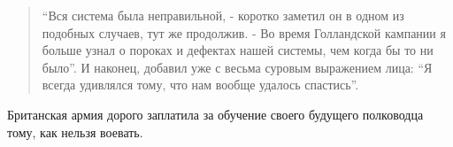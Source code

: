\documentclass[
  oneside,
  12pt,
  titlepage]{book}
\begin{document}
\begin{quote}
``Вся система была неправильной, - коротко заметил он в одном из подобных случаев, тут же продолжив. - Во время Голландской кампании я больше узнал о пороках и дефектах нашей системы, чем когда бы то ни было''. И наконец, добавил уже с весьма суровым выражением лица: ``Я всегда удивлялся тому, что нам вообще удалось спастись''.
\end{quote}

Британская армия дорого заплатила за обучение своего будущего полководца тому, как нельзя воевать.
\end{document}
